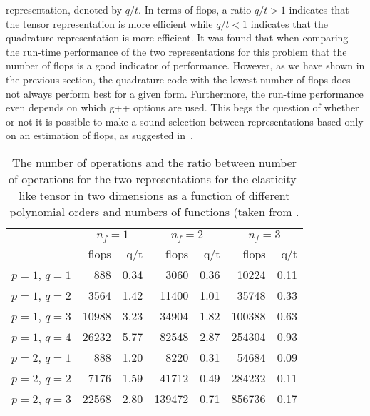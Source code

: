 representation, denoted by $q/t$.  In terms of flops, a ratio $q/t >
1$ indicates that the tensor representation is more efficient while
$q/t < 1$ indicates that the quadrature representation is more
efficient.  It was found that when comparing the run-time performance
of the two representations for this problem that the number of flops
is a good indicator of performance.  However, as we have shown in the
previous section, the quadrature code with the lowest number of flops
does not always perform best for a given form. Furthermore, the
run-time performance even depends on which g++ options are used.  This
begs the question of whether or not it is possible to make a sound
selection between representations based only on an estimation of
flops, as suggested in~\citet{OelgaardWells2010}.

\begin{table}
  \caption{The number of operations and the ratio between number of
    operations for the two representations for the elasticity-like
    tensor in two dimensions as a function of different polynomial
    orders and numbers of functions (taken from
    \citet{OelgaardWells2010}.}
  \label{oelgaard-2:tab:elasticity2D_complex_comparison}
  \begin{center}\small
    \begin{tabular}{l|rr|rr|rr}
      \multicolumn{1}{c}{} & \multicolumn{2}{c}{$n_f = 1$} & \multicolumn{2}{c}{$n_f = 2$} & \multicolumn{2}{c}{$n_f = 3$}\\
      & flops & q/t          & flops & q/t          & flops & q/t\\
      \hline
      $p = 1$, $q = 1$  &    888  &  0.34               &    3060 &  0.36               &   10224 & 0.11\\
      $p = 1$, $q = 2$  &   3564  &  1.42               &   11400 &  1.01               &   35748 & 0.33\\
      $p = 1$, $q = 3$  &  10988  &  3.23               &   34904 &  1.82               &  100388 & 0.63\\
      $p = 1$, $q = 4$  &  26232  &  5.77               &   82548 &  2.87               &  254304 & 0.93\\
      \hline
      $p = 2$, $q = 1$  &    888  &  1.20               &    8220 &  0.31               &   54684 & 0.09\\
      $p = 2$, $q = 2$  &   7176  &  1.59               &   41712 &  0.49               &  284232 & 0.11\\
      $p = 2$, $q = 3$  &  22568  &  2.80               &  139472 &  0.71               &  856736 & 0.17\\

\end{tabular}
\end{center}
\end{table}
